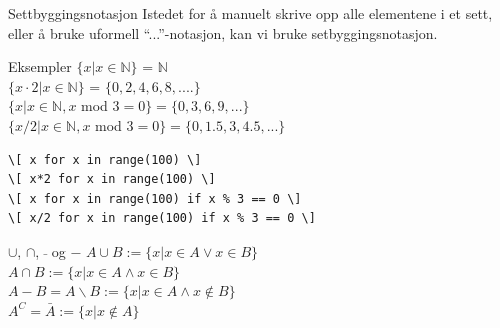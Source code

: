 \begin{frame}[fragile]{Settbyggingsnotasjon}
    Istedet for å manuelt skrive opp alle elementene i et sett, eller å bruke uformell \enquote{...}-notasjon, kan vi bruke setbyggingsnotasjon.
    \begin{block}{Eksempler}
        $\{ x | x \in \mathbb{N}\}$ = $\mathbb{N}$\\
        $\{ x \cdot 2 | x \in \mathbb{N}\}$ = $\{0, 2, 4, 6, 8, ....\}$\\
        $\{x | x \in \mathbb{N}, x$ mod $3 = 0 \} = \{0, 3, 6, 9, ...\}$\\
        $\{x/2 | x \in \mathbb{N}, x$ mod $3 = 0\} = \{0, 1.5, 3, 4.5, ...\}$
    \end{block}
    \pause
    \begin{verbatim}
\[ x for x in range(100) \]
\[ x*2 for x in range(100) \]
\[ x for x in range(100) if x % 3 == 0 \]
\[ x/2 for x in range(100) if x % 3 == 0 \]
    \end{verbatim}
\end{frame} 

\begin{frame}{$\cup$, $\cap$, $\bar{}$ og $-$}
    $A \cup B := \{x | x \in A \lor x \in B\}$ \\
    $A \cap B := \{x | x \in A \land x \in B\}$\\
    $A - B = A \backslash B := \{x | x \in A\land  x \notin B\}$\\
    $A^C = \bar{A} := \{x | x \notin A\}$
    
    \begin{figure}%
        \centering
        \qquad
        \qquad
        \qquad
        \label{fig:example2}%
    \end{figure}
\end{frame}

